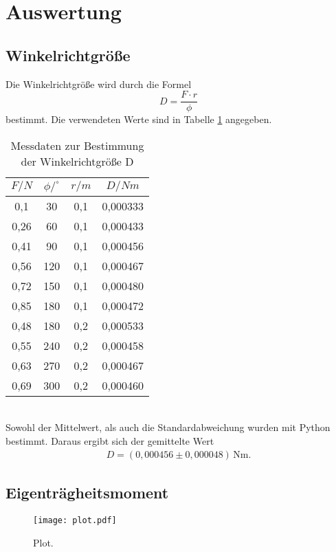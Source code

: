 \section{Auswertung}
\label{sec:Auswertung}
\subsection{Winkelrichtgröße}
Die Winkelrichtgröße wird durch die Formel
\begin{equation}
  D = \frac{F \cdot r}{\phi}
\end{equation}
bestimmt. Die verwendeten Werte sind in Tabelle \ref{tab:winkelrichtgr} angegeben.
\begin{table}
  \centering
  \caption{Messdaten zur Bestimmung der Winkelrichtgröße D}
  \label{tab:winkelrichtgr}
  \begin{tabular}{c c c c}
    \toprule
    $F/N$ & $\phi /^{\circ}$ & $r/m$ & $D/Nm$ \\
    \midrule
    0,1  &  30 & 0,1 & 0,000333 \\
    0,26 &  60 & 0,1 & 0,000433 \\
    0,41 &  90 & 0,1 & 0,000456 \\
    0,56 & 120 & 0,1 & 0,000467 \\
    0,72 & 150 & 0,1 & 0,000480 \\
    0,85 & 180 & 0,1 & 0,000472 \\
    0,48 & 180 & 0,2 & 0,000533 \\
    0,55 & 240 & 0,2 & 0,000458 \\
    0,63 & 270 & 0,2 & 0,000467 \\
    0,69 & 300 & 0,2 & 0,000460 \\
    \bottomrule
  \end{tabular}
\end{table}
\\Sowohl der Mittelwert, als auch die Standardabweichung wurden mit Python bestimmt. Daraus ergibt sich der
gemittelte Wert
\begin{align*}
    D = (0{,}000456 \pm 0{,}000048)\,\mathrm{Nm} .
\end{align*}

\subsection{Eigenträgheitsmoment}
 \begin{figure}
   \centering
   \texttt{[image: plot.pdf]}
   \caption{Plot.}
   \label{fig:plot}
 \end{figure}

